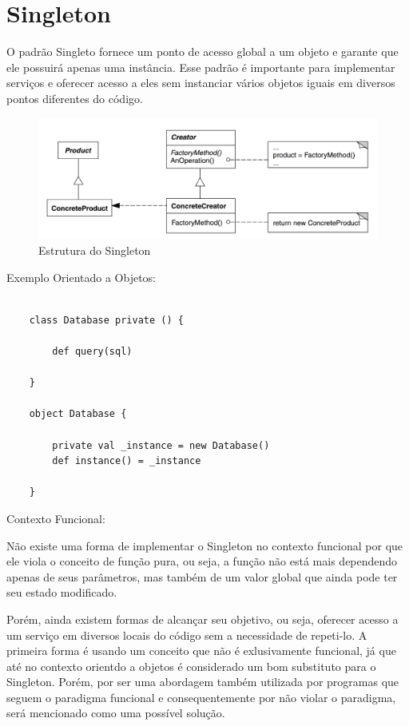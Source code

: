 \section{Singleton}

O padrão Singleto fornece um ponto de acesso global a um objeto 
e garante que ele possuirá apenas uma instância. Esse padrão 
é importante para implementar serviços e oferecer acesso a eles
sem instanciar vários objetos iguais em diversos pontos diferentes 
do código.


\begin{figure}[htb]
	\caption{\label{singleton_struct}Estrutura do Singleton}
	\begin{center}
	    \includegraphics[scale=0.4]{5_padroes-contexto-funcional/5.1_criacionais/5.1.1_factory-method/diagram.png}
	\end{center}
\end{figure}

Exemplo Orientado a Objetos:

\begin{lstlisting}[caption={Singleton Orientação a Objetos},label=oosingleton]
    
    class Database private () {

        def query(sql)

    }

    object Database {

        private val _instance = new Database()
        def instance() = _instance

    }

\end{lstlisting}

Contexto Funcional:

Não existe uma forma de implementar o Singleton no contexto funcional 
por que ele viola o conceito de função pura, ou seja, a função não 
está mais dependendo apenas de seus parâmetros, mas também de um 
valor global que ainda pode ter seu estado modificado.

Porém, ainda existem formas de alcançar seu objetivo, ou seja, 
oferecer acesso a um serviço em diversos locais do código sem a necessidade 
de repeti-lo. A primeira forma é usando um conceito que não é exlusivamente funcional, 
já que até no contexto orientdo a objetos é considerado um bom substituto 
para o Singleton. Porém, por ser uma abordagem também utilizada por 
programas que seguem o paradigma funcional e consequentemente por não 
violar o paradigma, será mencionado como uma possível solução.

